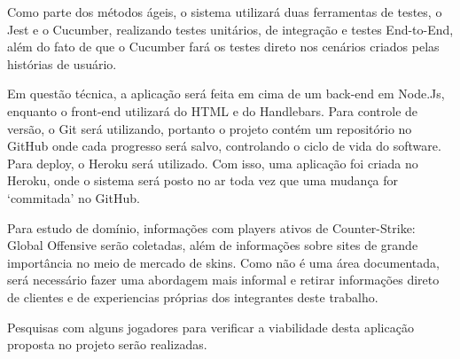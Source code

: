 Como parte dos métodos ágeis, o sistema utilizará duas ferramentas de testes, o Jest e o Cucumber, realizando testes unitários, de integração e testes End-to-End, além do fato de que o Cucumber fará os testes direto nos cenários criados pelas histórias de usuário.

Em questão técnica, a aplicação será feita em cima de um back-end em Node.Js, enquanto o front-end utilizará do HTML e do Handlebars. Para controle de versão, o Git será utilizando, portanto o projeto contém um repositório no GitHub onde cada progresso será salvo, controlando o ciclo de vida do software. Para deploy, o Heroku será utilizado. Com isso, uma aplicação foi criada no Heroku, onde o sistema será posto no ar toda vez que uma mudança for ‘commitada’ no GitHub.

Para estudo de domínio, informações com players ativos de Counter-Strike: Global Offensive serão coletadas, além de informações sobre sites de grande importância no meio de mercado de skins. Como não é uma área documentada, será necessário fazer uma abordagem mais informal e retirar informações direto de clientes e de experiencias próprias dos integrantes deste trabalho.

Pesquisas com alguns jogadores para verificar a viabilidade desta aplicação proposta no projeto serão realizadas.


